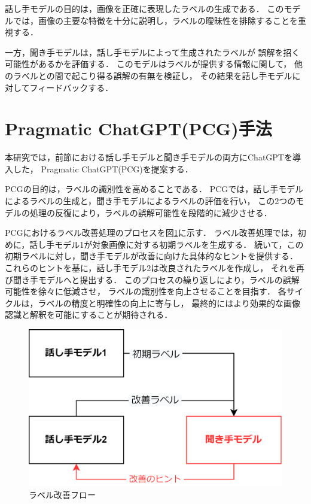 \documentclass[a4paper,11pt]{jreport}
\begin{document}
話し手モデルの目的は，画像を正確に表現したラベルの生成である．
このモデルでは，画像の主要な特徴を十分に説明し，ラベルの曖昧性を排除することを重視する．

一方，聞き手モデルは，話し手モデルによって生成されたラベルが
誤解を招く可能性があるかを評価する．
このモデルはラベルが提供する情報に関して，
他のラベルとの間で起こり得る誤解の有無を検証し，
その結果を話し手モデルに対してフィードバックする．

\section{Pragmatic ChatGPT(PCG)手法}
本研究では，前節における話し手モデルと聞き手モデルの両方にChatGPTを導入した，
Pragmatic ChatGPT(PCG)を提案する．

PCGの目的は，ラベルの識別性を高めることである．
PCGでは，話し手モデルによるラベルの生成と，聞き手モデルによるラベルの評価を行い，
この2つのモデルの処理の反復により，ラベルの誤解可能性を段階的に減少させる．

PCGにおけるラベル改善処理のプロセスを図\ref{fig:PCGflow}に示す．
ラベル改善処理では，初めに，話し手モデル1が対象画像に対する初期ラベルを生成する．
続いて，この初期ラベルに対し，聞き手モデルが改善に向けた具体的なヒントを提供する．
これらのヒントを基に，話し手モデル2は改良されたラベルを作成し，
それを再び聞き手モデルへと提出する．
このプロセスの繰り返しにより，ラベルの誤解可能性を徐々に低減させ，
ラベルの識別性を向上させることを目指す．
各サイクルは，ラベルの精度と明確性の向上に寄与し，
最終的にはより効果的な画像認識と解釈を可能にすることが期待される．

\begin{figure}[H]
	\centering
	\includegraphics[width=0.8\linewidth]{figures/PCGflow.png}
	\caption{ラベル改善フロー}
	\label{fig:PCGflow}
\end{figure}
\end{document}
